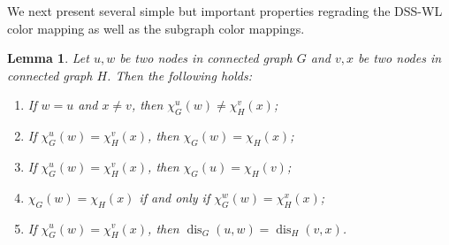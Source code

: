 \documentclass{article} %
\newtheorem{lemma}[theorem]{Lemma}
\newcommand*{\dis}{{\operatorname{dis}}}
\begin{document}
We next present several simple but important properties regrading the DSS-WL color mapping as well as the subgraph color mappings.
\begin{lemma}
\label{thm:proof_dsswl_key}
Let $u,w$ be two nodes in connected graph $G$ and $v,x$ be two nodes in connected graph $H$. Then the following holds:
\begin{enumerate}[label=(\alph*),topsep=0pt,leftmargin=30pt]
\setlength{\itemsep}{0pt}
    \item If $w=u$ and $x\neq v$, then $\chi_G^u(w)\neq \chi_H^v(x)$;
    \item If $\chi_G^u(w)=\chi_H^v(x)$, then $\chi_G(w)=\chi_H(x)$;
    \item If $\chi_G^u(w)=\chi_H^v(x)$, then $\chi_G(u)=\chi_H(v)$;
    \item $\chi_G(w)=\chi_H(x)$ if and only if $\chi_G^w(w)=\chi_H^x(x)$;
    \item If $\chi_G^u(w)=\chi_H^v(x)$, then $\dis_G(u,w)=\dis_H(v,x)$.
\end{enumerate}
\end{lemma}
\end{document}
